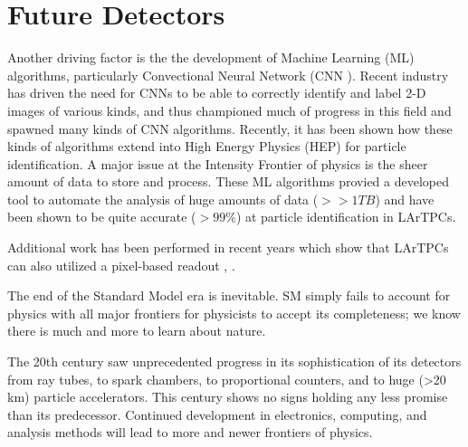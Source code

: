 
\section{Future Detectors}

\citep{Sadowski_2017}
Another driving factor is the the development of Machine Learning (ML) algorithms, particularly Convectional Neural Network (CNN \citep{Sadowski2017DeepLI}).
Recent industry has driven the need for CNNs to be able to correctly identify and label 2-D images of various kinds, and thus championed much of progress in this field and spawned many kinds of CNN algorithms.
Recently, it has been shown how these kinds of algorithms extend into High Energy Physics (HEP) for particle identification.
A major issue at the Intensity Frontier of physics is the sheer amount of data to store and process.
These ML algorithms provied a developed tool to automate the analysis of huge amounts of data ($>> 1 TB$) and have been shown to be quite accurate ($>99\%$) at particle identification in LArTPCs.


Additional work has been performed in recent years which show that LArTPCs can also utilized a pixel-based readout \citep{larpix:Dwyer_2018}, \citep{Asaadi_2018}.

The end of the Standard Model era is inevitable.
SM simply fails to account for physics with all major frontiers for physicists to accept its completeness; we know there is much and more to learn about nature.

The 20th century saw unprecedented progress in its sophistication of its detectors from ray tubes, to spark chambers, to proportional counters, and to huge (>20 km) particle accelerators.
This century shows no signs holding any less promise than its predecessor.
Continued development in electronics, computing, and analysis methods will lead to more and newer frontiers of physics.

